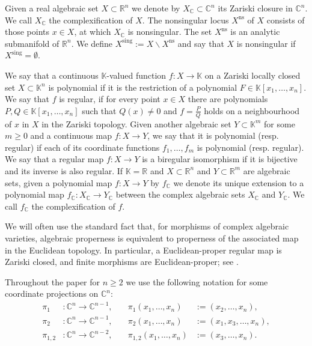 \documentclass{amsart}
\theoremstyle{plain}
\theoremstyle{definition}
\theoremstyle{remark}
\numberwithin{equation}{thm} %
\newcommand{\R}{\mathbb{R}}
\newcommand{\C}{\mathbb{C}}
\newcommand{\K}{\mathbb{K}}
\newcommand{\ns}{\mathrm{ns}}
\newcommand{\sing}{\mathrm{sing}}
\begin{document}
Given a real algebraic set $X\subset \R^n$ we denote by $X_\C\subset \C^n$ its Zariski closure in $\C^n$. We call $X_\C$ the complexification of $X$. The nonsingular locus $X^{\ns}$ of $X$ consists of those points $x\in X$, at which $X_\C$ is nonsingular. The set $X^\ns$ is an analytic submanifold of $\R^n$. We define $X^{\sing}:=X\backslash X^{\ns}$ and say that $X$ is nonsingular if $X^\sing=\emptyset$. 

We say that a continuous $\K$-valued function $f:X\rightarrow \K$ on a Zariski locally closed set $X\subset \K^n$ is polynomial if it is the restriction of a polynomial $F\in \K[x_1,\dots,x_n]$. We say that $f$ is regular, if for every point $x\in X$ there are polynomials $P,Q\in \K[x_1,\dots,x_n]$ such that $Q(x)\neq 0$ and $f=\frac{P}{Q}$ holds on a neighbourhood of $x$ in $X$ in the Zariski topology. Given another algebraic set $Y\subset \K^m$ for some $m\geq0$ and a continuous map $f:X\rightarrow Y$, we say that it is polynomial (resp. regular) if each of its coordinate functions $f_1,\dots,f_m$ is polynomial (resp. regular). We say that a regular map $f:X\rightarrow Y$ is a biregular isomorphism if it is bijective and its inverse is also regular. If $\K=\R$ and $X\subset \R^n$ and $Y\subset \R^m$ are algebraic sets, given a polynomial map $f:X\rightarrow Y$ by $f_\C$ we denote its unique extension to a polynomial map $f_\C:X_\C\rightarrow Y_\C$ between the complex algebraic sets $X_\C$ and $Y_\C$. We call $f_\C$ the complexification of $f$. 

We will often use the standard fact that, for morphisms of complex algebraic varieties, algebraic properness is equivalent to properness of the associated map in the Euclidean topology. In particular, a Euclidean-proper regular map is Zariski closed, and finite morphisms are Euclidean-proper; see \cite[Appendix B]{hartshorneAlgebraicGeometry1977}.

Throughout the paper for $n\geq 2$ we use the following notation for some coordinate projections on $\C^n$:
\begin{align*}
    \pi_1&:\C^n\rightarrow \C^{n-1}, &\pi_1(x_1,\dots, x_n)&:=(x_2,\dots,x_n), \\ 
    \pi_2&:\C^n\rightarrow \C^{n-1},\quad &\pi_2(x_1,\dots, x_n)&:=(x_1,x_3,\dots,x_n), \\ 
    \pi_{1,2}&:\C^n\rightarrow \C^{n-2},\quad &\pi_{1,2}(x_1,\dots, x_n)&:=(x_3,\dots,x_n). 
\end{align*}
\end{document}
